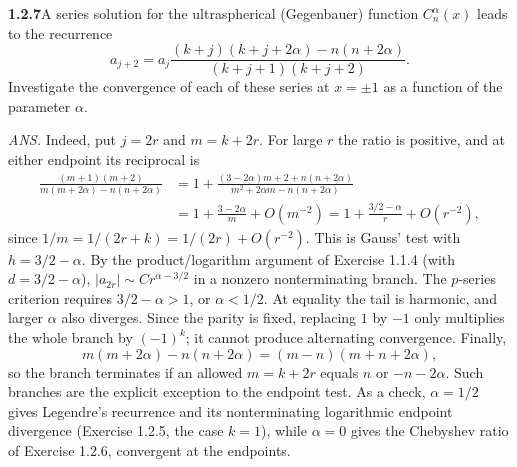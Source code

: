 \par\bigskip
\noindent\textbf{1.2.7}\quad A series solution for the ultraspherical
(Gegenbauer) function $C_{n}^{\alpha}(x)$ leads to the recurrence
\[
a_{j+2}=a_{j}\frac{(k+j)(k+j+2\alpha)-n(n+2\alpha)}{(k+j+1)(k+j+2)}.
\]
 Investigate the convergence of each of these series at $x=\pm1$ as a function
of the parameter $\alpha$.
\par\nobreak\hfill\emph{ANS.}\enspace {}
\solution
{}
Indeed, put $j=2r$ and $m=k+2r$. For large $r$ the ratio is positive,
and at either endpoint its reciprocal is
\[
 \begin{aligned}
 \frac{(m+1)(m+2)}{m(m+2\alpha)-n(n+2\alpha)}
 &=1+\frac{(3-2\alpha)m+2+n(n+2\alpha)}{m^2+2\alpha m-n(n+2\alpha)}\\
 &=1+\frac{3-2\alpha}{m}+O(m^{-2})
 =1+\frac{3/2-\alpha}{r}+O(r^{-2}),
 \end{aligned}
\]
since $1/m=1/(2r+k)=1/(2r)+O(r^{-2})$. This is Gauss' test with
$h=3/2-\alpha$.
By the product/logarithm argument of Exercise 1.1.4 (with
$d=3/2-\alpha$), $|a_{2r}|\sim C r^{\alpha-3/2}$ in a nonzero
nonterminating branch. The $p$-series criterion requires $3/2-\alpha>1$, or
$\alpha<1/2$. At equality the tail is harmonic, and larger $\alpha$
also diverges. Since the parity is fixed, replacing $1$ by $-1$ only
multiplies the whole branch by $(-1)^k$; it cannot produce alternating
convergence. Finally,
\[
 m(m+2\alpha)-n(n+2\alpha)=(m-n)(m+n+2\alpha),
\]
so the branch terminates if an allowed $m=k+2r$ equals $n$ or
$-n-2\alpha$. Such branches are the explicit exception to the endpoint
test. As a check, $\alpha=1/2$ gives Legendre's recurrence and its
nonterminating logarithmic endpoint divergence (Exercise 1.2.5, the case
$k=1$), while $\alpha=0$ gives the Chebyshev ratio of Exercise 1.2.6,
convergent at the endpoints.


